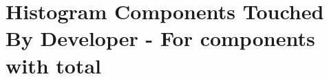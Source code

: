 \section{Histogram Components Touched By Developer - For components with total } 
\label{sec:codebase_graph_latex.repository_graph.histogram_components_touched_by_developer} 



